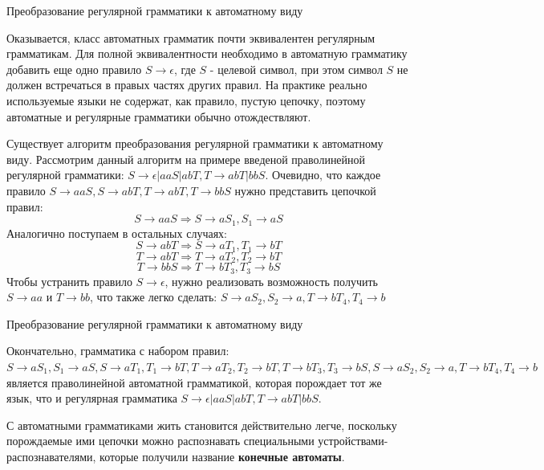 \documentclass[12pt, pdf, hyperref={unicode},handout]{beamer}
\begin{document}
\begin{frame}{Преобразование регулярной грамматики к автоматному виду}
  \begin{block}

    \small{
      Оказывается, класс автоматных грамматик почти эквивалентен регулярным грамматикам. Для полной эквивалентности необходимо в автоматную грамматику добавить еще одно правило $S\rightarrow \epsilon$, где $S$ - целевой символ, при этом символ $S$ не должен встречаться в правых частях других правил. На практике реально используемые языки не содержат, как правило, пустую цепочку, поэтому автоматные и регулярные грамматики обычно отождествляют.

      Существует алгоритм преобразования регулярной грамматики к автоматному виду. Рассмотрим данный алгоритм на примере введеной праволинейной регулярной грамматики: $S\rightarrow\epsilon|aaS|abT, T\rightarrow abT|bbS$. Очевидно, что каждое правило $S\rightarrow aaS, S\rightarrow abT, T\rightarrow abT, T\rightarrow bbS$ нужно представить цепочкой правил:
      $$S\rightarrow aaS\Rightarrow S\rightarrow aS_1, S_1\rightarrow aS$$
      Аналогично поступаем в остальных случаях:   $$S\rightarrow abT\Rightarrow S\rightarrow aT_1, T_1\rightarrow bT$$
      $$T\rightarrow abT\Rightarrow T\rightarrow aT_2, T_2\rightarrow bT$$
      $$T\rightarrow bbS\Rightarrow T\rightarrow bT_3, T_3\rightarrow bS$$
Чтобы устранить правило $S\rightarrow \epsilon$, нужно реализовать возможность получить $S\rightarrow aa$ и $T\rightarrow bb$, что также легко сделать: $S\rightarrow aS_2, S_2\rightarrow a, T\rightarrow bT_4, T_4\rightarrow b$
}

  \end{block}
  
\end{frame}

\begin{frame}{Преобразование регулярной грамматики к автоматному виду}
  \begin{block}

    \small{
      Окончательно, грамматика с набором правил: $S\rightarrow aS_1, S_1\rightarrow aS, S\rightarrow aT_1, T_1\rightarrow bT, T\rightarrow aT_2, T_2\rightarrow bT, T\rightarrow bT_3, T_3\rightarrow bS, S\rightarrow aS_2, S_2\rightarrow a, T\rightarrow bT_4, T_4\rightarrow b$ является праволинейной автоматной грамматикой, которая порождает тот же язык, что и регулярная грамматика $S\rightarrow\epsilon|aaS|abT, T\rightarrow abT|bbS$.

      С автоматными грамматиками жить становится действительно легче, поскольку порождаемые ими цепочки можно распознавать специальными устройствами-распознавателями, которые получили название \textbf{конечные автоматы}. 

}

  \end{block}
  
\end{frame}
\end{document}

